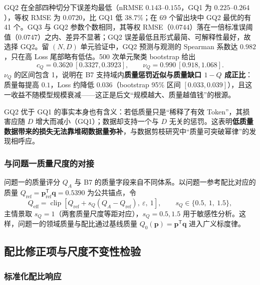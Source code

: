 GQ2 在全部四种切分下误差均最低（nRMSE $0.143$--$0.155$，GQ1 为 $0.225$--$0.264$），等权 RMSE 为 $0.0720$，比 GQ1 低 $38.7\%$；在 69 个留出块中 GQ2 最优的有 41 个。GQ3 与 GQ2 参数个数相同，其等权 RMSE（$0.0744$）落在一倍标准误阈值（$0.0747$）之内、差异不显著；GQ2 误差最低且形式最简、可解释性最好，故选择 GQ2。留 $(N,D)$ 单元验证中，GQ2 预测与观测的 Spearman 系数达 $0.982$，只在高 Loss 尾部略有低估。500 次单元聚类 bootstrap 给出
\begin{equation}
c_Q=0.3620\ [0.3327,0.3923],\qquad \nu_Q=0.990\ [0.918,1.068].
\label{eq:p2_quality_est}
\end{equation}
$\nu_Q$ 的区间包含 1，说明在 B7 支持域内\textbf{质量惩罚近似与质量缺口 $1-Q$ 成正比}：质量每提高 $0.1$，Loss 约降低 $0.036$（bootstrap 95\% 区间 $[0.033,0.039]$），且这一收益不随模型规模衰减——这正是后文“规模越大、质量越值钱”的根源。

GQ2 优于 GQ1 的事实本身也有含义：若低质量只是“稀释了有效 Token”，其损害应随 $D$ 增大而减小（GQ1）；数据却支持一个与 $D$ 无关的惩罚。这表明\textbf{低质量数据带来的损失无法靠堆砌数据量弥补}，与数据剪枝研究中“质量可突破幂律”的发现相呼应\cite{sorscher2022beyond}。

\subsubsection{与问题一质量尺度的对接}

问题一的质量评分 $Q_A$ 与 B7 的质量字段来自不同体系。以问题一参考配比对应的质量 $Q_{\mathrm{ref}}=\boldsymbol p_{\mathrm{ref}}^{\mathsf T}\boldsymbol q=0.5390$ 为公共锚点，令
\begin{equation}
Q_{\mathrm{eff}}=\operatorname{clip}\!\left[Q_{\mathrm{ref}}+s_Q(Q_A-Q_{\mathrm{ref}}),\ \varepsilon,\ 1\right],\qquad s_Q\in\{0.5,\ 1,\ 1.5\},
\label{eq:p2_qmap}
\end{equation}
主情景取 $s_Q=1$（两套质量尺度等距对应），$s_Q=0.5,1.5$ 用于敏感性分析。这样，问题一的领域质量与配比通过基线质量 $Q_0(\boldsymbol p)=\boldsymbol p^{\mathsf T}\boldsymbol q$ 进入广义标度律。

\subsection{配比修正项与尺度不变性检验}
\label{sec:p2_mixture}

\subsubsection{标准化配比响应}

